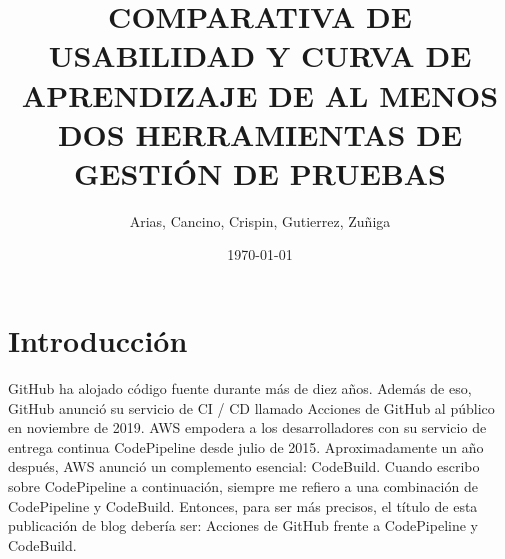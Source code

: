 \documentclass[twoside,twocolumn]{article}
\title{COMPARATIVA DE USABILIDAD Y CURVA DE APRENDIZAJE DE AL MENOS DOS HERRAMIENTAS DE GESTIÓN DE PRUEBAS} %
\author{Arias, Cancino, Crispin, Gutierrez, Zuñiga}
\date{\today} %
\begin{document}
\maketitle
\vspace*{5 in}
\section{Introducción}
GitHub ha alojado código fuente durante más de diez años. Además de eso, GitHub anunció su servicio de CI / CD llamado Acciones de GitHub al público en noviembre de 2019.
AWS empodera a los desarrolladores con su servicio de entrega continua CodePipeline desde julio de 2015. Aproximadamente un año después, AWS anunció un complemento esencial: CodeBuild. Cuando escribo sobre CodePipeline a continuación, siempre me refiero a una combinación de CodePipeline y CodeBuild. Entonces, para ser más precisos, el título de esta publicación de blog debería ser: Acciones de GitHub frente a CodePipeline y CodeBuild.
\\
\end{document}
